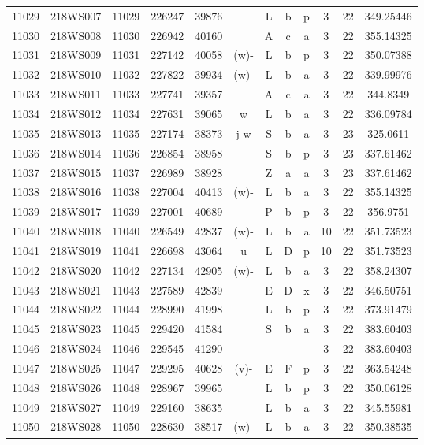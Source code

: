 \begin{tabular}{|*{12}{c|}}
11029 & 218WS007 & 11029 & 226247 & 39876 &  & L & b & p & 3 & 22 & 349.25446 \\ 
11030 & 218WS008 & 11030 & 226942 & 40160 &  & A & c & a & 3 & 22 & 355.14325 \\ 
11031 & 218WS009 & 11031 & 227142 & 40058 & (w)- & L & b & p & 3 & 22 & 350.07388 \\ 
11032 & 218WS010 & 11032 & 227822 & 39934 & (w)- & L & b & a & 3 & 22 & 339.99976 \\ 
11033 & 218WS011 & 11033 & 227741 & 39357 &  & A & c & a & 3 & 22 & 344.8349 \\ 
11034 & 218WS012 & 11034 & 227631 & 39065 & w & L & b & a & 3 & 22 & 336.09784 \\ 
11035 & 218WS013 & 11035 & 227174 & 38373 & j-w & S & b & a & 3 & 23 & 325.0611 \\ 
11036 & 218WS014 & 11036 & 226854 & 38958 &  & S & b & p & 3 & 23 & 337.61462 \\ 
11037 & 218WS015 & 11037 & 226989 & 38928 &  & Z & a & a & 3 & 23 & 337.61462 \\ 
11038 & 218WS016 & 11038 & 227004 & 40413 & (w)- & L & b & a & 3 & 22 & 355.14325 \\ 
11039 & 218WS017 & 11039 & 227001 & 40689 &  & P & b & p & 3 & 22 & 356.9751 \\ 
11040 & 218WS018 & 11040 & 226549 & 42837 & (w)- & L & b & a & 10 & 22 & 351.73523 \\ 
11041 & 218WS019 & 11041 & 226698 & 43064 & u & L & D & p & 10 & 22 & 351.73523 \\ 
11042 & 218WS020 & 11042 & 227134 & 42905 & (w)- & L & b & a & 3 & 22 & 358.24307 \\ 
11043 & 218WS021 & 11043 & 227589 & 42839 &  & E & D & x & 3 & 22 & 346.50751 \\ 
11044 & 218WS022 & 11044 & 228990 & 41998 &  & L & b & p & 3 & 22 & 373.91479 \\ 
11045 & 218WS023 & 11045 & 229420 & 41584 &  & S & b & a & 3 & 22 & 383.60403 \\ 
11046 & 218WS024 & 11046 & 229545 & 41290 &  &  &  &  & 3 & 22 & 383.60403 \\ 
11047 & 218WS025 & 11047 & 229295 & 40628 & (v)- & E & F & p & 3 & 22 & 363.54248 \\ 
11048 & 218WS026 & 11048 & 228967 & 39965 &  & L & b & p & 3 & 22 & 350.06128 \\ 
11049 & 218WS027 & 11049 & 229160 & 38635 &  & L & b & a & 3 & 22 & 345.55981 \\ 
11050 & 218WS028 & 11050 & 228630 & 38517 & (w)- & L & b & a & 3 & 22 & 350.38535 \\ 

\end{tabular}
